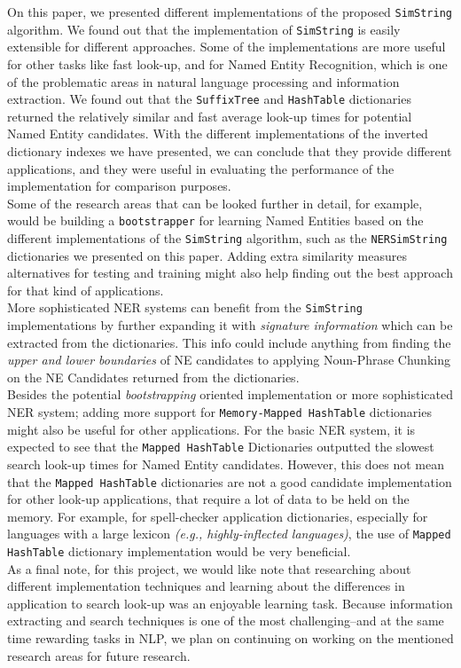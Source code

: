 On this paper, we presented different implementations of the proposed \texttt{SimString} algorithm. We found out that the implementation of \texttt{SimString} is easily extensible for different approaches. Some of the implementations are more useful for other tasks like fast look-up, and for Named Entity Recognition, which is one of the problematic areas in natural language processing and information extraction. We found out that the \texttt{SuffixTree} and \texttt{HashTable} dictionaries returned the relatively similar and fast average look-up times for potential Named Entity candidates. With the different implementations of the inverted dictionary indexes we have presented, we can conclude that they provide different applications, and they were useful in evaluating the performance of the implementation for comparison purposes.\\

Some of the research areas that can be looked further in detail, for example, would be building a \texttt{bootstrapper} for learning Named Entities based on the different implementations of the \texttt{SimString} algorithm, such as the \texttt{NERSimString} dictionaries we presented on this paper. Adding extra similarity measures alternatives for testing and training might also help finding out the best approach for that kind of applications.\\

More sophisticated NER systems can benefit from the \texttt{SimString} implementations by further expanding it with \textit{signature information} which can be extracted from the dictionaries. This info could include anything from finding the \textit{upper and lower boundaries} of NE candidates to applying Noun-Phrase Chunking on the NE Candidates returned from the dictionaries.\\

Besides the potential \textit{bootstrapping} oriented implementation or more sophisticated NER system; adding more support for \texttt{Memory-Mapped HashTable} dictionaries might also be useful for other applications. For the basic NER system, it is expected to see that the \texttt{Mapped HashTable} Dictionaries outputted the slowest search look-up times for Named Entity candidates. However, this does not mean that the \texttt{Mapped HashTable} dictionaries are not a good candidate implementation for other look-up applications, that require a lot of data to be held on the memory. For example, for spell-checker application dictionaries, especially for languages with a large lexicon \textit{(e.g., highly-inflected languages)}, the use of \texttt{Mapped HashTable} dictionary implementation would be very beneficial.\\

As a final note, for this project, we would like note that researching about different implementation techniques and learning about the differences in application to search look-up was an enjoyable learning task. Because information extracting and search techniques is one of the most challenging--and at the same time rewarding tasks in NLP, we plan on continuing on working on the mentioned research areas for future research.